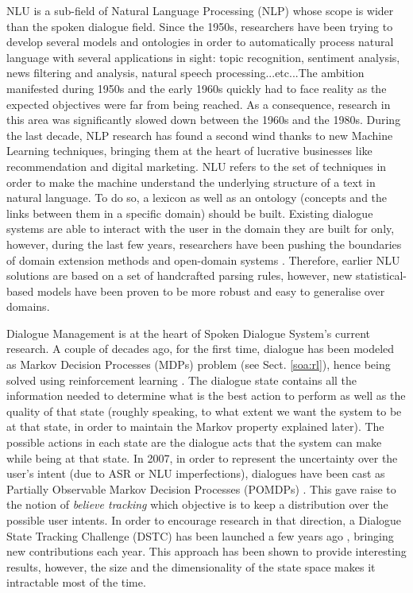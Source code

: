 		NLU is a sub-field of Natural Language Processing (NLP) whose scope is wider than the spoken dialogue field. Since the 1950s, researchers have been trying to develop several models and ontologies in order to automatically process natural language with several applications in sight: topic recognition, sentiment analysis, news filtering and analysis, natural speech processing...etc...The ambition manifested during 1950s and the early 1960s quickly had to face reality as the expected objectives were far from being reached. As a consequence, research in this area was significantly slowed down between the 1960s and the 1980s. During the last decade, NLP research has found a second wind thanks to new Machine Learning techniques, bringing them at the heart of lucrative businesses like recommendation and digital marketing. NLU refers to the set of techniques in order to make the machine understand the underlying structure of a text in natural language. To do so, a lexicon as well as an ontology (concepts and the links between them in a specific domain) should be built. Existing dialogue systems are able to interact with the user in the domain they are built for only, however, during the last few years, researchers have been pushing the boundaries of domain  extension methods \cite{Gasic2013} and open-domain systems \cite{Pakucs2003,EkeinhorKomi2014,Wang2014}. Therefore, earlier NLU solutions are based on a set of handcrafted parsing rules, however, new statistical-based models \cite{Macherey2009} have been proven to be more robust and easy to generalise over domains.

		Dialogue Management is at the heart of Spoken Dialogue System's current research. A couple of decades ago, for the first time, dialogue has been modeled as Markov Decision Processes (MDPs) problem (see Sect. \ref{soa:rl}), hence being solved using reinforcement learning \cite{Eckert1997}. The dialogue state contains all the information needed to determine what is the best action to perform as well as the quality of that state (roughly speaking, to what extent we want the system to be at that state, in order to maintain the Markov property explained later). The possible actions in each state are the dialogue acts that the system can make while being at that state. In 2007, in order to represent the uncertainty over the user's intent (due to ASR or NLU imperfections), dialogues have been cast as Partially Observable Markov Decision Processes (POMDPs) \cite{Williams2007}. This gave raise to the notion of \textit{believe tracking} which objective is to keep a distribution over the possible user intents. In order to encourage research in that direction, a Dialogue State Tracking Challenge (DSTC) has been launched a few years ago \cite{Williams2012b}, bringing new contributions each year. This approach has been shown to provide interesting results, however, the size and the dimensionality of the state space makes it intractable most of the time.
		
